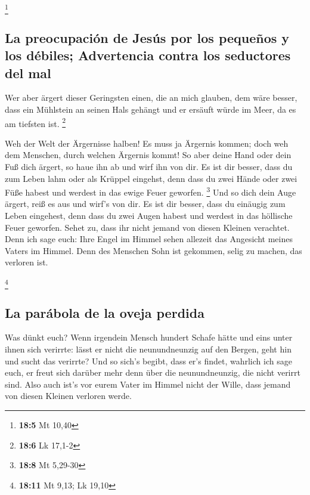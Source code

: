 \footnote{\textbf{18:5} Mt 10,40}

\hypertarget{la-preocupaciuxf3n-de-jesuxfas-por-los-pequeuxf1os-y-los-duxe9biles-advertencia-contra-los-seductores-del-mal}{%
\subsection{La preocupación de Jesús por los pequeños y los débiles;
Advertencia contra los seductores del
mal}\label{la-preocupaciuxf3n-de-jesuxfas-por-los-pequeuxf1os-y-los-duxe9biles-advertencia-contra-los-seductores-del-mal}}

 Wer aber ärgert dieser Geringsten einen, die an mich
glauben, dem wäre besser, dass ein Mühlstein an seinen Hals gehängt und
er ersäuft würde im Meer, da es am tiefsten ist. \footnote{\textbf{18:6}
  Lk 17,1-2}

 Weh der Welt der Ärgernisse halben! Es muss ja Ärgernis
kommen; doch weh dem Menschen, durch welchen Ärgernis kommt!
 So aber deine Hand oder dein Fuß dich ärgert, so haue ihn
ab und wirf ihn von dir. Es ist dir besser, dass du zum Leben lahm oder
als Krüppel eingehst, denn dass du zwei Hände oder zwei Füße habest und
werdest in das ewige Feuer geworfen. \footnote{\textbf{18:8} Mt 5,29-30}
 Und so dich dein Auge ärgert, reiß es aus und wirf's von
dir. Es ist dir besser, dass du einäugig zum Leben eingehest, denn dass
du zwei Augen habest und werdest in das höllische Feuer geworfen.
 Sehet zu, dass ihr nicht jemand von diesen Kleinen
verachtet. Denn ich sage euch: Ihre Engel im Himmel sehen allezeit das
Angesicht meines Vaters im Himmel.  Denn des Menschen
Sohn ist gekommen, selig zu machen, das verloren ist.

\footnote{\textbf{18:11} Mt 9,13; Lk 19,10}

\hypertarget{la-paruxe1bola-de-la-oveja-perdida}{%
\subsection{La parábola de la oveja
perdida}\label{la-paruxe1bola-de-la-oveja-perdida}}

 Was dünkt euch? Wenn irgendein Mensch hundert Schafe
hätte und eins unter ihnen sich verirrte: lässt er nicht die
neunundneunzig auf den Bergen, geht hin und sucht das verirrte?
 Und so sich's begibt, dass er's findet, wahrlich ich
sage euch, er freut sich darüber mehr denn über die neunundneunzig, die
nicht verirrt sind.  Also auch ist's vor eurem Vater im
Himmel nicht der Wille, dass jemand von diesen Kleinen verloren werde.

